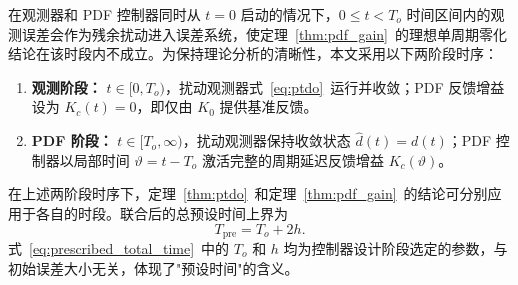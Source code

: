 在观测器和 PDF 控制器同时从 \(t=0\) 启动的情况下，\(0\le t<T_o\) 时间区间内的观测误差会作为残余扰动进入误差系统，使定理~\ref{thm:pdf_gain}~的理想单周期零化结论在该时段内不成立。为保持理论分析的清晰性，本文采用以下两阶段时序：

\begin{enumerate}
  \item \textbf{观测阶段：} \(t\in[0,T_o)\)，扰动观测器式~\eqref{eq:ptdo}~运行并收敛；PDF 反馈增益设为 \(K_c(t)=0\)，即仅由 \(K_0\) 提供基准反馈。
  \item \textbf{PDF 阶段：} \(t\in[T_o,\infty)\)，扰动观测器保持收敛状态 \(\hat d(t)=d(t)\)；PDF 控制器以局部时间 \(\vartheta = t-T_o\) 激活完整的周期延迟反馈增益 \(K_c(\vartheta)\)。
\end{enumerate}

在上述两阶段时序下，定理~\ref{thm:ptdo}~和定理~\ref{thm:pdf_gain}~的结论可分别应用于各自的时段。联合后的总预设时间上界为
\begin{equation}
T_{\mathrm{pre}} = T_o + 2h.
\label{eq:prescribed_total_time}
\end{equation}
式~\eqref{eq:prescribed_total_time}~中的 \(T_o\) 和 \(h\) 均为控制器设计阶段选定的参数，与初始误差大小无关，体现了"预设时间"的含义。